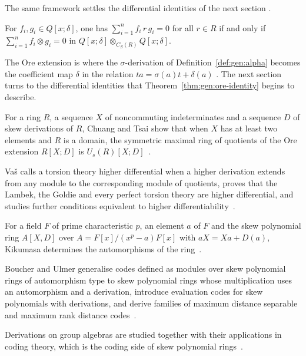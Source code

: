 The same framework settles the differential identities of the next section
\cite[p.~172]{ChuangLee2010Higher}.

\begin{theorem}\label{thm:gen:ore-identity}
For $f_i,g_i\in Q[x;\delta]$, one has $\sum_{i=1}^n f_i\, r\, g_i=0$ for all
$r\in R$ if and only if $\sum_{i=1}^n f_i\otimes g_i=0$ in
$Q[x;\delta]\otimes_{C_S(R)}Q[x;\delta]$.
\end{theorem}

The Ore extension is where the $\sigma$-derivation of
Definition~\ref{def:gen:alpha} becomes the coefficient map $\delta$ in the
relation $ta=\sigma(a)t+\delta(a)$ \cite[p.~2838]{Chuang2017Auto}. The next
section turns to the
differential identities that Theorem~\ref{thm:gen:ore-identity} begins to
describe.

For a ring $R$, a sequence $X$ of noncommuting indeterminates and a sequence $D$ of skew derivations of $R$, Chuang and Tsai show that when $X$ has at least two elements and $R$ is a domain, the symmetric maximal ring of quotients of the Ore extension $R[X;D]$ is $U_s(R)[X;D]$~\cite{WlSymmetricUtumiQuotientRingsOfO2010}.

Va\v{s} calls a torsion theory higher differential when a higher derivation extends from any module to the corresponding module of quotients, proves that the Lambek, the Goldie and every perfect torsion theory are higher differential, and studies further conditions equivalent to higher differentiability~\cite{WlExtendingHigherDerivationsToRi2008}.

For a field $F$ of prime characteristic $p$, an element $a$ of $F$ and the skew polynomial ring $A[X,D]$ over $A=F[x]/(x^p-a)F[x]$ with $aX=Xa+D(a)$, Kikumasa determines the automorphisms of the ring~\cite{WlAutomorphismsOfACertainSkewPol1990}.

Boucher and Ulmer generalise codes defined as modules over skew polynomial rings of automorphism type to skew polynomial rings whose multiplication uses an automorphism and a derivation, introduce evaluation codes for skew polynomials with derivations, and derive families of maximum distance separable and maximum rank distance codes~\cite{WlLinearCodesUsingSkewPolynomial2014}.

Derivations on group algebras are studied together with their applications in coding theory, which is the coding side of skew polynomial rings~\cite{WlDerivationsOnGroupAlgebrasWith2020}.

